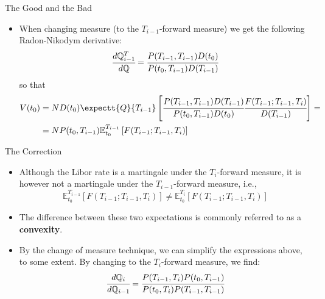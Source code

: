 \documentclass{beamer}
\begin{document}
\begin{frame}{The Good and the Bad}
\begin{itemize}
\item When changing measure (to the $T_{i-1}$-forward measure) we get the following Radon-Nikodym derivative:
\begin{equation*}
\cfrac{d\mathbb{Q}^T_{i-1}}{d\mathbb{Q}}=\cfrac{P(T_{i-1},T_{i-1})D(t_0)}{P(t_0,T_{i-1})D(T_{i-1})}
\end{equation*}
so that
\begin{equation*}
\begin{aligned}
V(t_0) &= N D(t_0)\expectt{Q}{T_{i-1}}\left[\cfrac{P(T_{i-1},T_{i-1})D(T_{i-1})}{P(t_0,T_{i-1})D(t_0)}\cfrac{F(T_{i-1};T_{i-1},T_i)}{D(T_{i-1})}\right] = \\
&= N P(t_0,T_{i-1})\mathbb{E}^{T_{i-1}}_{t_0}\left[F(T_{i-1};T_{i-1},T_i)\right]
\end{aligned}
\end{equation*}
\end{itemize}
\end{frame}

\begin{frame}{The Correction}
\begin{itemize}
\item Although the Libor rate is a martingale under the $T_i$-forward
measure, it is however not a martingale under the $T_{i-1}$-forward measure, i.e.,
\begin{equation*}
	\mathbb{E}^{T_{i-1}}_{t_0}\left[F(T_{i-1};T_{i-1},T_i)\right]\neq \mathbb{E}^{T_i}_{t_0}\left[F(T_{i-1};T_{i-1},T_i)\right]
\end{equation*}
\item The difference between these two expectations is commonly referred to as a \textbf{convexity}. 		
\item By the change of measure technique, we can simplify the expressions above, to some extent. By changing to the $T_i$-forward measure, we find:
\begin{equation*}
	\cfrac{d\mathbb{Q}_i}{d\mathbb{Q}_{i-1}}=\cfrac{P(T_{i-1},T_i)P(t_0,T_{i-1})}{P(t_0,T_i)P(T_{i-1},T_{i-1})}
\end{equation*}
\end{itemize}
\end{frame}
\end{document}
